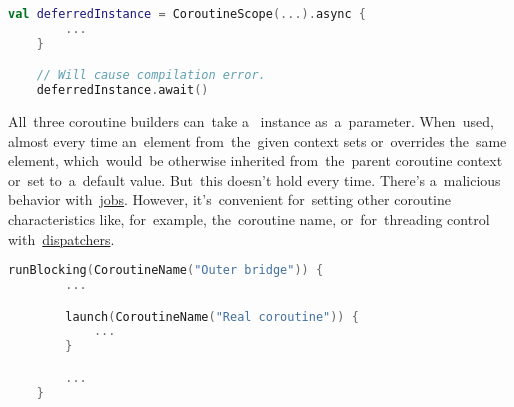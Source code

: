 \begin{lstlisting}[language=Kotlin]
    val deferredInstance = CoroutineScope(...).async {
        ...
    }

    // Will cause compilation error.
    deferredInstance.await()
\end{lstlisting}

\warning All~three coroutine builders can~take a~ instance as~a~parameter.
When~used, almost every time an~element from~the~given context sets or~overrides the~same element, which~would~be otherwise inherited from~the~parent coroutine context or~set to~a~default value.
But~this doesn't hold every time.
There's a~malicious behavior with~\hyperref[kotlincoroutinejob]{jobs}.
However, it's~convenient for~setting other coroutine characteristics like, for~example, the~coroutine name, or~for~threading control with~\hyperref[kotlincoroutinedispatcher]{dispatchers}.

\begin{lstlisting}[language=Kotlin]
    runBlocking(CoroutineName("Outer bridge")) {
        ...

        launch(CoroutineName("Real coroutine")) {
            ...
        }

        ...
    }
\end{lstlisting}
\newpage
